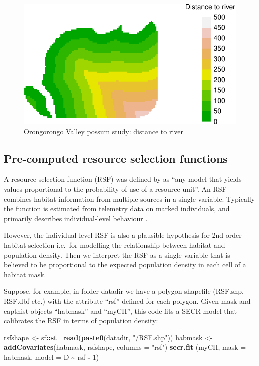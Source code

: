 \documentclass[
]{book}
\newenvironment{Shaded}{\begin{snugshade}}{\end{snugshade}}
\newcommand{\AttributeTok}[1]{\textcolor[rgb]{0.13,0.29,0.53}{#1}}
\newcommand{\DecValTok}[1]{\textcolor[rgb]{0.00,0.00,0.81}{#1}}
\newcommand{\FunctionTok}[1]{\textcolor[rgb]{0.13,0.29,0.53}{\textbf{#1}}}
\newcommand{\NormalTok}[1]{#1}
\newcommand{\OtherTok}[1]{\textcolor[rgb]{0.56,0.35,0.01}{#1}}
\newcommand{\SpecialCharTok}[1]{\textcolor[rgb]{0.81,0.36,0.00}{\textbf{#1}}}
\newcommand{\StringTok}[1]{\textcolor[rgb]{0.31,0.60,0.02}{#1}}
\begin{document}
\begin{figure}
\includegraphics[width=0.8\linewidth]{SECRbook_files/figure-latex/dtrplot-1} \caption{Orongorongo Valley possum study: distance to river}\label{fig:dtrplot}
\end{figure}

\subsection{Pre-computed resource selection functions}\label{pre-computed-resource-selection-functions}

A resource selection function (RSF) was defined by \citet{bvns02} as ``any model that yields values proportional to the probability of use of a resource unit''. An RSF combines habitat information from multiple sources in a single variable. Typically the function is estimated from telemetry data on marked individuals, and primarily describes individual-level behaviour \citep[3rd-order habitat selection of][]{j80}.

However, the individual-level RSF is also a plausible hypothesis for 2nd-order habitat selection i.e.~for modelling the relationship between habitat and population density. Then we interpret the RSF as a single variable that is believed to be proportional to the expected population density in each cell of a habitat mask.

Suppose, for example, in folder datadir we have a polygon shapefile (RSF.shp, RSF.dbf etc.) with the attribute ``rsf'' defined for each polygon. Given mask and capthist objects ``habmask'' and ``myCH'', this code fits a SECR model that calibrates the RSF in terms of population density:

\begin{Shaded}
\begin{Highlighting}[]
\NormalTok{rsfshape }\OtherTok{\textless{}{-}}\NormalTok{ sf}\SpecialCharTok{::}\FunctionTok{st\_read}\NormalTok{(}\FunctionTok{paste0}\NormalTok{(datadir, }\StringTok{"/RSF.shp"}\NormalTok{))}
\NormalTok{habmask }\OtherTok{\textless{}{-}} \FunctionTok{addCovariates}\NormalTok{(habmask, rsfshape, }\AttributeTok{columns =} \StringTok{"rsf"}\NormalTok{)}
\FunctionTok{secr.fit}\NormalTok{ (myCH, }\AttributeTok{mask =}\NormalTok{ habmask, }\AttributeTok{model =}\NormalTok{ D }\SpecialCharTok{\textasciitilde{}}\NormalTok{ rsf }\SpecialCharTok{{-}} \DecValTok{1}\NormalTok{)}
\end{Highlighting}
\end{Shaded}
\end{document}
